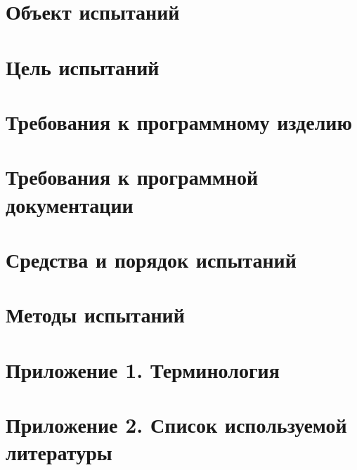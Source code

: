 \documentclass[
encoding=utf8
]{./twoeskd}
\begin{document}

% 

\newpage
{}
\tableofcontents

\newpage
\section{Объект испытаний}


\newpage
\section{Цель испытаний}


\newpage
\section{Требования к программному изделию}


\newpage
\section{Требования к программной документации}


\newpage
\section{Средства и порядок испытаний}


\newpage
\section{Методы испытаний}


\newpage
\section*{Приложение 1. Терминология}


%

\newpage
\section*{Приложение 2. Список используемой литературы}



\newpage
\eskdListOfChanges

\end{document}
